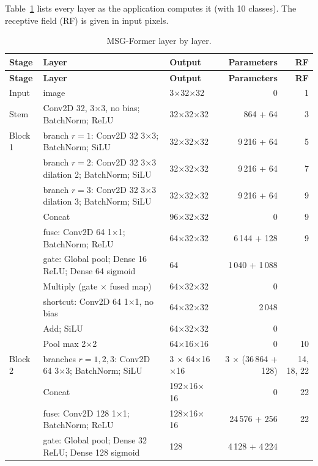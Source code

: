 \documentclass[11pt,a4paper]{article}
\begin{document}
Table~\ref{tab:msglayers} lists every layer as the application computes it (with 10 classes). The receptive field (RF) is given in
input pixels.

{\small
\begin{longtable}{@{}p{1.8cm}p{5.5cm}lrr@{}}
\caption{MSG-Former layer by layer.}\label{tab:msglayers}\\
\toprule
\textbf{Stage} & \textbf{Layer} & \textbf{Output} & \textbf{Parameters} & \textbf{RF}\\
\midrule\endfirsthead
\toprule
\textbf{Stage} & \textbf{Layer} & \textbf{Output} & \textbf{Parameters} & \textbf{RF}\\
\midrule\endhead
Input & image & 3$\times$32$\times$32 & 0 & 1\\
Stem & Conv2D 32, 3$\times$3, no bias; BatchNorm; ReLU & 32$\times$32$\times$32 & 864 + 64 & 3\\
Block 1 & branch $r=1$: Conv2D 32 3$\times$3; BatchNorm; SiLU & 32$\times$32$\times$32 & 9\,216 + 64 & 5\\
 & branch $r=2$: Conv2D 32 3$\times$3 dilation 2; BatchNorm; SiLU & 32$\times$32$\times$32 & 9\,216 + 64 & 7\\
 & branch $r=3$: Conv2D 32 3$\times$3 dilation 3; BatchNorm; SiLU & 32$\times$32$\times$32 & 9\,216 + 64 & 9\\
 & Concat & 96$\times$32$\times$32 & 0 & 9\\
 & fuse: Conv2D 64 1$\times$1; BatchNorm; ReLU & 64$\times$32$\times$32 & 6\,144 + 128 & 9\\
 & gate: Global pool; Dense 16 ReLU; Dense 64 sigmoid & 64 & 1\,040 + 1\,088 & \\
 & Multiply (gate $\times$ fused map) & 64$\times$32$\times$32 & 0 & \\
 & shortcut: Conv2D 64 1$\times$1, no bias & 64$\times$32$\times$32 & 2\,048 & \\
 & Add; SiLU & 64$\times$32$\times$32 & 0 & \\
 & Pool max 2$\times$2 & 64$\times$16$\times$16 & 0 & 10\\
Block 2 & branches $r=1,2,3$: Conv2D 64 3$\times$3; BatchNorm; SiLU & 3 $\times$ 64$\times$16$\times$16 & 3 $\times$ (36\,864 + 128) & 14, 18, 22\\
 & Concat & 192$\times$16$\times$16 & 0 & 22\\
 & fuse: Conv2D 128 1$\times$1; BatchNorm; ReLU & 128$\times$16$\times$16 & 24\,576 + 256 & 22\\
 & gate: Global pool; Dense 32 ReLU; Dense 128 sigmoid & 128 & 4\,128 + 4\,224 & \\

\end{longtable}}
\end{document}
